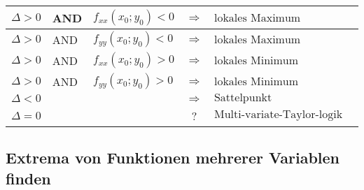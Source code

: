 \begin{enumerate}[itemsep=1ex]
    \begin{tabular}{lllcl}
        \hline
        $\Delta > 0$ &AND& $f_{xx}(x_0;y_0) < 0$ &$\Longrightarrow$& $\text{lokales Maximum}$\\
        \hline
        $\Delta > 0$ &AND& $f_{yy}(x_0;y_0) < 0$ &$\Longrightarrow$& $\text{lokales Maximum}$\\
        \hline
        $\Delta > 0$ &AND& $f_{xx}(x_0;y_0) > 0$ &$\Longrightarrow$& $\text{lokales Minimum}$\\
        \hline
        $\Delta > 0$ &AND& $f_{yy}(x_0;y_0) > 0$ &$\Longrightarrow$& $\text{lokales Minimum}$\\
        \hline
        $\Delta < 0$ &&&$\Longrightarrow$& $\text{Sattelpunkt}$\\
        \hline
        $\Delta = 0$ &&&?& $\text{Multi-variate-Taylor-logik ...}$\\
        \hline
    \end{tabular}

\end{enumerate}

\subsection{Extrema von Funktionen mehrerer Variablen finden}


